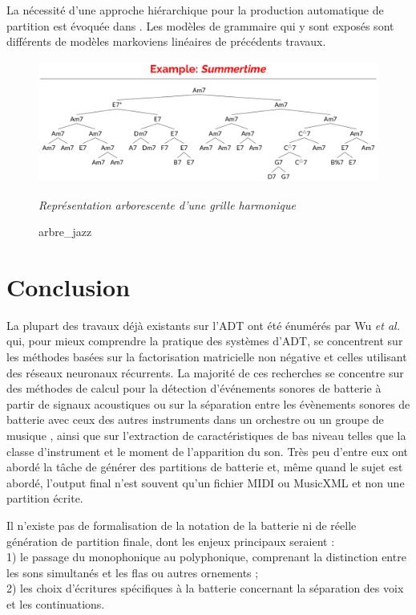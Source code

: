 La nécessité d’une approche hiérarchique pour la production automatique de partition est évoquée dans \cite{foscarin:hal-01988990}. 
Les modèles de grammaire qui y sont exposés sont différents de modèles markoviens linéaires de précédents travaux.\newpage
\begin{figure}[h]
	\centering
	\includegraphics[height=40mm, width=120mm]{z_images/2_etat_de_l_art/1_summertime_tree.png}
	\caption{arbre\_jazz}
	\textit{Représentation arborescente d’une grille harmonique} \cite{harasimjazz}
\end{figure}

\section*{Conclusion}
La plupart des travaux déjà existants sur l’ADT ont été énumérés par Wu \textit{et al.} \cite{Review_ADT} qui, 
pour mieux comprendre la pratique des systèmes d’ADT, se concentrent sur les méthodes basées sur la factorisation matricielle non négative et celles utilisant des réseaux neuronaux récurrents. 
La majorité de ces recherches se concentre sur des méthodes de calcul pour la détection d'événements sonores de batterie à partir de signaux acoustiques ou sur la séparation entre les évènements sonores de batterie avec ceux des autres instruments dans un orchestre ou un groupe de musique \cite{2802}, ainsi que sur l'extraction de caractéristiques de bas niveau telles que la classe d'instrument et le moment de l'apparition du son. 
Très peu d'entre eux ont abordé la tâche de générer des partitions de batterie et, même quand le sujet est abordé, l’output final n’est souvent qu’un fichier MIDI ou MusicXML et non une partition écrite.

Il n’existe pas de formalisation de la notation de la batterie ni de réelle génération de partition finale, 
dont les enjeux principaux seraient :\\1) le passage du monophonique au polyphonique, comprenant la distinction entre les sons simultanés et les flas ou autres ornements ;\\2) les choix d’écritures spécifiques à la batterie concernant la séparation des voix et les continuations.
